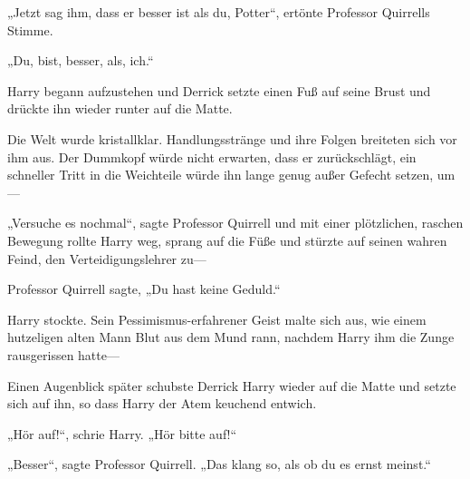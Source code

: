 „Jetzt sag ihm, dass er besser ist als du, Potter“, ertönte Professor Quirrells Stimme.

„Du, bist, besser, als, ich.“

Harry begann aufzustehen und Derrick setzte einen Fuß auf seine Brust und drückte ihn wieder runter auf die Matte.

Die Welt wurde kristallklar. Handlungsstränge und ihre Folgen breiteten sich vor ihm aus. Der Dummkopf würde nicht erwarten, dass er zurückschlägt, ein schneller Tritt in die Weichteile würde ihn lange genug außer Gefecht setzen, um—

„Versuche es nochmal“, sagte Professor Quirrell und mit einer plötzlichen, raschen Bewegung rollte Harry weg, sprang auf die Füße und stürzte auf seinen wahren Feind, den Verteidigungslehrer zu—

Professor Quirrell sagte, „Du hast keine Geduld.“

Harry stockte. Sein Pessimismus-erfahrener Geist malte sich aus, wie einem hutzeligen alten Mann Blut aus dem Mund rann, nachdem Harry ihm die Zunge rausgerissen hatte—

Einen Augenblick später schubste Derrick Harry wieder auf die Matte und setzte sich auf ihn, so dass Harry der Atem keuchend entwich.

„Hör auf!“, schrie Harry. „Hör bitte auf!“

„Besser“, sagte Professor Quirrell. „Das klang so, als ob du es ernst meinst.“

